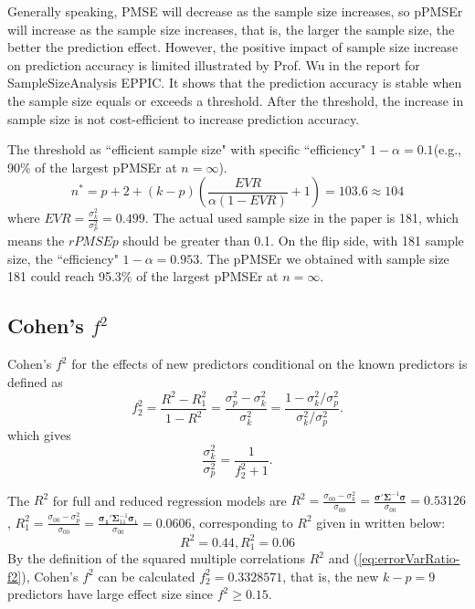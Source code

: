\documentclass[11pt]{article}
\begin{document}
Generally speaking, PMSE will decrease as the sample size increases, so pPMSEr will increase as the sample size increases, that is, the larger the sample size, the better the prediction effect. However, the positive impact of sample size increase on prediction accuracy is limited illustrated by Prof. Wu in the report for SampleSizeAnalysis EPPIC.
It shows that the prediction accuracy is stable when the sample size equals or exceeds a threshold. After the threshold, the increase in sample size is not cost-efficient to increase prediction accuracy. 

The threshold as ``efficient sample size" with specific ``efficiency" $1-\alpha = 0.1$(e.g., 90\% of the largest pPMSEr at $n=\infty$). 
$$
n^* = p+2+(k-p)\left(\frac{EVR}{\alpha(1-EVR)}+1\right) = 103.6\approx 104
$$
where $EVR = \frac{\sigma_k^2}{\sigma_p^2}=0.499$.
The actual used sample size in the paper is 181, which means the $rPMSEp$ should be greater than 0.1. On the flip side, with 181 sample size, the ``efficiency" $1-\alpha = 0.953$. The pPMSEr we obtained with sample size 181 could reach 95.3\% of the largest pPMSEr at $n=\infty$.


\subsection{Cohen's $f^2$}

Cohen's $f^2$ for the effects of new predictors conditional on the known predictors is defined as
\begin{equation}
\label{eq:f2}
f_2^2 = \frac{R^2 - R_1^2}{1- R^2} = \frac{\sigma_p^2 - \sigma_k^2}{\sigma_k^2} = \frac{1 - \sigma_k^2/\sigma_p^2}{\sigma_k^2/\sigma_p^2}.
\end{equation}
which gives 
\begin{equation}
\label{eq:errorVarRatio-f2}
\frac{\sigma_k^2}{\sigma_p^2}=\frac{1}{f_2^2 + 1}.
\end{equation}

The $R^2$ for full and reduced regression models are 
$R^2 = \frac{\sigma_{00}-\sigma^2_k}{\sigma_{00}} = \frac{\boldsymbol{\sigma}' \boldsymbol{\Sigma}^{-1} \boldsymbol{\sigma}}{\sigma_{00}} = 0.53126$, $R_1^2 = \frac{\sigma_{00}-\sigma^2_p}{\sigma_{00}} = \frac{\boldsymbol{\sigma_1}' \boldsymbol{\Sigma}_{11}^{-1} \boldsymbol{\sigma}_1}{\sigma_{00}} = 0.0606$,
corresponding to $R^2$ given in \cite{baker2008chronicpain} written below:
$$R^2 = 0.44, R_1^2 = 0.06$$
By the definition of the squared multiple correlations $R^2$ and (\ref{eq:errorVarRatio-f2}), Cohen's $f^2$ can be calculated $f_2^2 = 0.3328571$, that is, the new $k-p = 9$ predictors have large effect size since $f^2\ge 0.15$.



\end{document}

